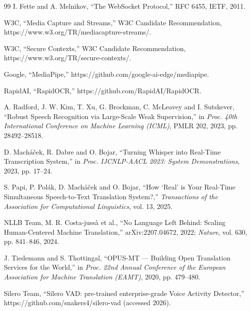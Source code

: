 \documentclass[12pt,singleside,a4paper]{article}
\begin{document}
{\begin{thebibliography}{99}
 I. Fette and A. Melnikov, ``The WebSocket Protocol,'' RFC 6455, IETF, 2011.

 W3C, ``Media Capture and Streams,'' W3C Candidate Recommendation, https://www.w3.org/TR/mediacapture-streams/.

 W3C, ``Secure Contexts,'' W3C Candidate Recommendation, https://www.w3.org/TR/secure-contexts/.

 Google, ``MediaPipe,'' https://github.com/google-ai-edge/mediapipe.

 RapidAI, ``RapidOCR,'' https://github.com/RapidAI/RapidOCR.


 A. Radford, J. W. Kim, T. Xu, G. Brockman, C. McLeavey and I. Sutskever, ``Robust Speech Recognition via Large-Scale Weak Supervision,'' in \textit{Proc. 40th International Conference on Machine Learning (ICML)}, PMLR 202, 2023, pp. 28492--28518.

 D. Mach\'{a}\v{c}ek, R. Dabre and O. Bojar, ``Turning Whisper into Real-Time Transcription System,'' in \textit{Proc. IJCNLP-AACL 2023: System Demonstrations}, 2023, pp. 17--24.

 S. Papi, P. Pol\'{a}k, D. Mach\'{a}\v{c}ek and O. Bojar, ``How `Real' is Your Real-Time Simultaneous Speech-to-Text Translation System?,'' \textit{Transactions of the Association for Computational Linguistics}, vol. 13, 2025.

 NLLB Team, M. R. Costa-juss\`{a} et al., ``No Language Left Behind: Scaling Human-Centered Machine Translation,'' arXiv:2207.04672, 2022; \textit{Nature}, vol. 630, pp. 841--846, 2024.

 J. Tiedemann and S. Thottingal, ``OPUS-MT --- Building Open Translation Services for the World,'' in \textit{Proc. 22nd Annual Conference of the European Association for Machine Translation (EAMT)}, 2020, pp. 479--480.

 Silero Team, ``Silero VAD: pre-trained enterprise-grade Voice Activity Detector,'' https://github.com/snakers4/silero-vad (accessed 2026).

\end{thebibliography}

}
\end{document}
